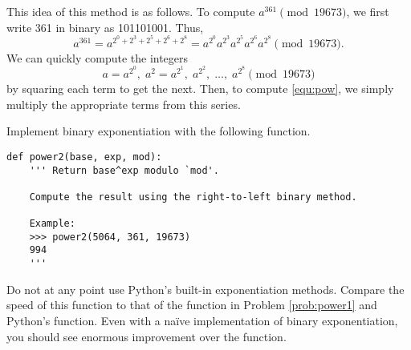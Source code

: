 This idea of this method is as follows. 
To compute $a^{361} \pmod{19673}$, we first write 361 in binary as 101101001. Thus,
\begin{equation}\label{equ:pow}
a^{361} = a^{2^0+2^3+2^5+2^6+2^8} = a^{2^0}a^{2^3}a^{2^5}a^{2^6}a^{2^8} \pmod{19673}.
\end{equation}
We can quickly compute the integers
\[
a=a^{2^0},\; a^2=a^{2^1}, \;a^{2^2}, \;\ldots, \;a^{2^8} \pmod{19673}
\]
by squaring each term to get the next. 
Then, to compute \eqref{equ:pow}, we simply multiply the appropriate terms from this series.

\begin{problem}
Implement binary exponentiation with the following function.
\begin{lstlisting}
def power2(base, exp, mod):
    ''' Return base^exp modulo `mod'.
    
    Compute the result using the right-to-left binary method.
    
    Example:
    >>> power2(5064, 361, 19673)
    994
    '''
\end{lstlisting}
Do not at any point use Python's built-in exponentiation methods.
Compare the speed of this function to that of the function in Problem \ref{prob:power1} and Python's  function.
Even with a na\"ive implementation of binary exponentiation, you should see enormous improvement over the  function.
\end{problem}



